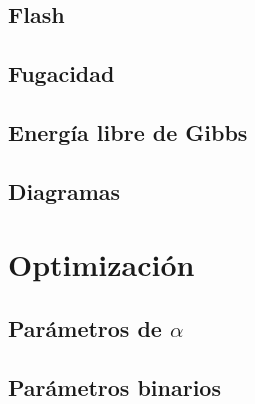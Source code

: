 		\subsection{Flash}
		\subsection{Fugacidad}
		\subsection{Energía libre de Gibbs}
		\subsection{Diagramas}
	\section{Optimización}	
		\subsection{Parámetros de $\alpha$}
		\subsection{Parámetros binarios}
